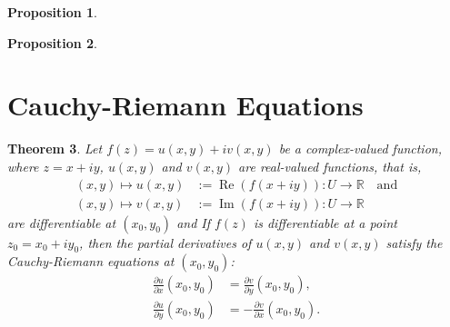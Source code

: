 \documentclass[12pt,openany]{book}
\newtheorem{theorem}{Theorem}
\newtheorem{proposition}[theorem]{Proposition}
\theoremstyle{definition}
\newcommand{\R}{\mathbb{R}}
\newcommand{\of}[1]{\left( #1 \right)}
\renewcommand{\Re}{\operatorname{Re}}
\renewcommand{\Im}{\operatorname{Im}}
\begin{document}
	
	\begin{tcolorbox}[colframe=procolor, title={\color{white}\bf }]
		\begin{proposition}
			
		\end{proposition}
	\end{tcolorbox}
	
	\begin{tcolorbox}[colframe=procolor, title={\color{white}\bf Chain Rule}]
		\begin{proposition}
			
		\end{proposition}
	\end{tcolorbox}

	\newpage
	\section{Cauchy-Riemann Equations}
	
	
	\begin{tcolorbox}[colframe=thmcolor, title={\color{white}\bf Cauchy-Riemann Equations}]
		\begin{theorem}
			Let $f(z) = u(x, y) + iv(x, y)$ be a complex-valued function, where $z = x + iy$, $u(x, y)$ and $v(x, y)$ are real-valued functions, that is, \begin{align*}
			(x,y)\mapsto u\of{x,y}&:=\Re\of{f(x+iy)}:U\to\R\quad\text{and}\\ (x,y)\mapsto v\of{x,y}&:=\Im\of{f(x+iy)}:U\to\R
			\end{align*} are differentiable at $(x_0,y_0)$ and
			If $f(z)$ is differentiable at a point $z_0 = x_0 + iy_0$, then the partial derivatives of $u(x, y)$ and $v(x, y)$ satisfy the Cauchy-Riemann equations at $(x_0, y_0)$: \begin{align*}
			\frac{\partial u}{\partial x}(x_0, y_0) &= \frac{\partial v}{\partial y}(x_0, y_0), \\
			\frac{\partial u}{\partial y}(x_0, y_0) &= -\frac{\partial v}{\partial x}(x_0, y_0).
			\end{align*}
 		\end{theorem}
	\end{tcolorbox}
	
\end{document}

